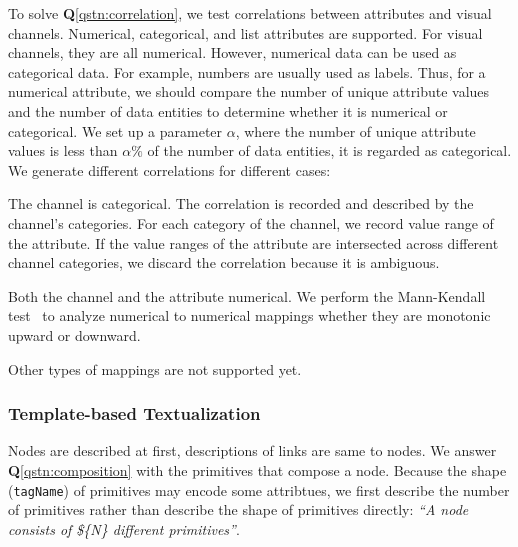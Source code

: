 To solve \textbf{Q}\ref{qstn:correlation}, we test correlations between attributes and visual channels.
Numerical, categorical, and list attributes are supported.
For visual channels, they are all numerical.
However, numerical data can be used as categorical data.
For example, numbers are usually used as labels.
Thus, for a numerical attribute, we should compare the number of unique attribute values and the number of data entities to determine whether it is numerical or categorical.
We set up a parameter $\alpha$, where the number of unique attribute values is less than $\alpha \%$ of the number of data entities, it is regarded as categorical.
We generate different correlations for different cases:
\begin{compactitem}
    \item The channel is categorical. The correlation is recorded and described by the channel's categories. For each category of the channel, we record value range of the attribute. %
    If the value ranges of the attribute are intersected across different channel categories, we discard the correlation because it is ambiguous.
    \item Both the channel and the attribute numerical. We perform the Mann-Kendall test~\cite{10.2307/1907187, kendall1948rank, Hussain2019pyMannKendall} to analyze numerical to numerical mappings whether they are monotonic upward or downward.
    \item Other types of mappings are not supported yet.
\end{compactitem}


\subsubsection {Template-based Textualization}
Nodes are described at first, descriptions of links are same to nodes.
We answer \textbf{Q}\ref{qstn:composition} with the primitives that compose a node.
Because the shape (\texttt{tagName}) of primitives may encode some attribtues, we first describe the number of primitives rather than describe the shape of primitives directly:
\textit{``A node consists of \$\{N\} different primitives''}. 

